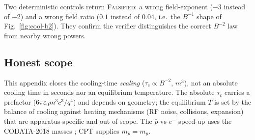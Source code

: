 Two deterministic controls return \textsc{Falsified}: a wrong field-exponent
($-3$ instead of $-2$) and a wrong field ratio ($0.1$ instead of $0.04$, i.e.\
the $B^{-1}$ shape of Fig.~\ref{fig:cool-b2}). They confirm the verifier
distinguishes the correct $B^{-2}$ law from nearby wrong powers.

\subsection{Honest scope}
\label{app:cool-scope}

This appendix closes the cooling-time \emph{scaling} ($\tau_c\propto B^{-2}$,
$m^3$), not an absolute cooling time in seconds nor an equilibrium
temperature. The absolute $\tau_c$ carries a prefactor
($6\pi\varepsilon_0 m^3 c^3/q^4$) and depends on geometry; the equilibrium
$T$ is set by the balance of cooling against heating mechanisms (RF noise,
collisions, expansion) that are apparatus-specific and out of scope. The
$\bar p$-vs-$e^-$ speed-up uses the CODATA-2018 masses
\citep{mohr2018codata}; CPT supplies $m_{\bar p}=m_p$.
